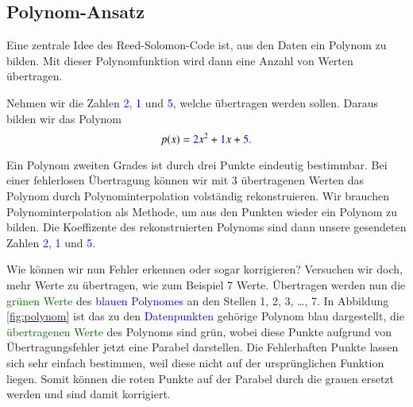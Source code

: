\subsection{Polynom-Ansatz
\label{reedsolomon:section:polynomansatz}}
Eine zentrale Idee des Reed-Solomon-Code ist, aus den Daten ein Polynom zu bilden. 
Mit dieser Polynomfunktion wird dann eine Anzahl von Werten übertragen.
\begin{beispiel} Nehmen wir die Zahlen \textcolor{blue}{2}, \textcolor{blue}{1} und \textcolor{blue}{5}, welche übertragen werden sollen. Daraus bilden wir das Polynom
\begin{equation}
p(x)
=
\textcolor{blue}{2}x^2 + \textcolor{blue}{1}x + \textcolor{blue}{5}.
\label{reedsolomon:equation1}
\end{equation}
\par 
Ein Polynom zweiten Grades ist durch drei Punkte eindeutig bestimmbar. 
Bei einer fehlerlosen Übertragung können wir mit 3 übertragenen Werten
    das Polynom durch Polynominterpolation volständig rekonstruieren.
Wir brauchen Polynominterpolation als Methode, um aus den Punkten wieder ein Polynom zu bilden.
Die Koeffizente des rekonstruierten Polynoms sind dann unsere gesendeten Zahlen \textcolor{blue}{2}, \textcolor{blue}{1} und \textcolor{blue}{5}.
\par 
Wie können wir nun Fehler erkennen oder sogar korrigieren?
Versuchen wir doch, mehr Werte zu übertragen, wie zum Beispiel 7 Werte. 
Übertragen werden nun die \textcolor{darkgreen}{grünen Werte} 
    des \textcolor{blue}{blauen Polynomes} an den Stellen 1, 2, 3, \dots , 7.
In Abbildung \ref{fig:polynom} ist das zu den \textcolor{blue}{Datenpunkten} gehörige Polynom blau dargestellt,
die \textcolor{darkgreen}{übertragenen Werte} des Polynoms sind grün, wobei diese Punkte aufgrund von Übertragungsfehler jetzt eine Parabel darstellen. 
Die Fehlerhaften Punkte lassen sich sehr einfach bestimmen, weil diese nicht auf der ursprünglichen Funktion liegen. 
Somit können die roten Punkte auf der Parabel durch die grauen ersetzt werden und sind damit korrigiert. 


\end{beispiel}
